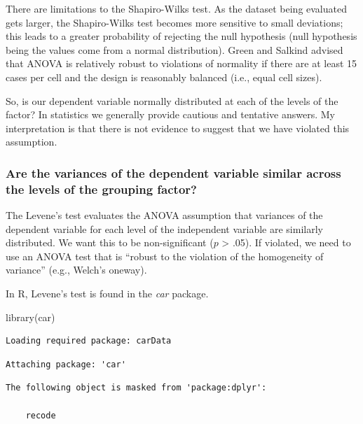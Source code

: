 \documentclass[
  english,
]{book}
\newenvironment{Shaded}{\begin{snugshade}}{\end{snugshade}}
\newcommand{\FunctionTok}[1]{\textcolor[rgb]{0.00,0.00,0.00}{#1}}
\newcommand{\NormalTok}[1]{#1}
\begin{document}
There are limitations to the Shapiro-Wilks test. As the dataset being evaluated gets larger, the Shapiro-Wilks test becomes more sensitive to small deviations; this leads to a greater probability of rejecting the null hypothesis (null hypothesis being the values come from a normal distribution). Green and Salkind \citeyearpar{green_using_2014} advised that ANOVA is relatively robust to violations of normality if there are at least 15 cases per cell and the design is reasonably balanced (i.e., equal cell sizes).

So, is our dependent variable normally distributed at each of the levels of the factor? In statistics we generally provide cautious and tentative answers. My interpretation is that there is not evidence to suggest that we have violated this assumption.

\hypertarget{are-the-variances-of-the-dependent-variable-similar-across-the-levels-of-the-grouping-factor}{%
\subsubsection{Are the variances of the dependent variable similar across the levels of the grouping factor?}\label{are-the-variances-of-the-dependent-variable-similar-across-the-levels-of-the-grouping-factor}}

The Levene's test evaluates the ANOVA assumption that variances of the dependent variable for each level of the independent variable are similarly distributed. We want this to be non-significant (\(p\) \textgreater{} .05). If violated, we need to use an ANOVA test that is ``robust to the violation of the homogeneity of variance'' (e.g., Welch's oneway).

In R, Levene's test is found in the \emph{car} package.

\begin{Shaded}
\begin{Highlighting}[]
\FunctionTok{library}\NormalTok{(car)}
\end{Highlighting}
\end{Shaded}

\begin{verbatim}
Loading required package: carData
\end{verbatim}

\begin{verbatim}
Attaching package: 'car'
\end{verbatim}

\begin{verbatim}
The following object is masked from 'package:dplyr':

    recode
\end{verbatim}
\end{document}
